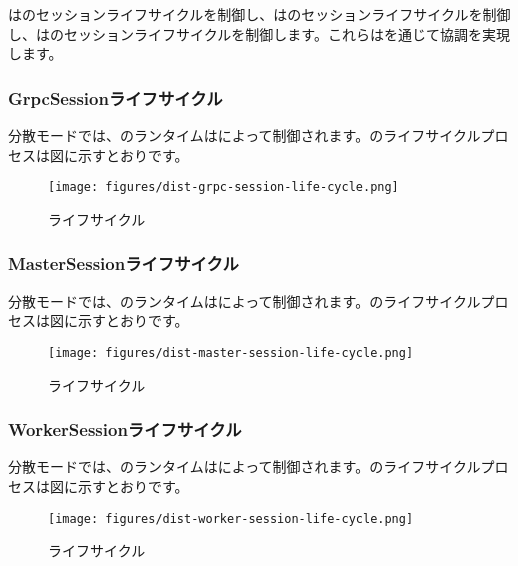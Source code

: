 \begin{content}
はのセッションライフサイクルを制御し、はのセッションライフサイクルを制御し、はのセッションライフサイクルを制御します。これらはを通じて協調を実現します。

\subsubsection{GrpcSessionライフサイクル}

分散モードでは、のランタイムはによって制御されます。のライフサイクルプロセスは図に示すとおりです。

\begin{figure}[H]
\centering
\texttt{[image: figures/dist-grpc-session-life-cycle.png]}
\caption{ライフサイクル}
 \label{fig:dist-grpc-session-life-cycle}
\end{figure}

\subsubsection{MasterSessionライフサイクル}

分散モードでは、のランタイムはによって制御されます。のライフサイクルプロセスは図に示すとおりです。

\begin{figure}[H]
\centering
\texttt{[image: figures/dist-master-session-life-cycle.png]}
\caption{ライフサイクル}
 \label{fig:dist-master-session-life-cycle}
\end{figure}

\subsubsection{WorkerSessionライフサイクル}

分散モードでは、のランタイムはによって制御されます。のライフサイクルプロセスは図に示すとおりです。

\begin{figure}[H]
\centering
\texttt{[image: figures/dist-worker-session-life-cycle.png]}
\caption{ライフサイクル}
 \label{fig:dist-worker-session-life-cycle}
\end{figure}


\end{content}
